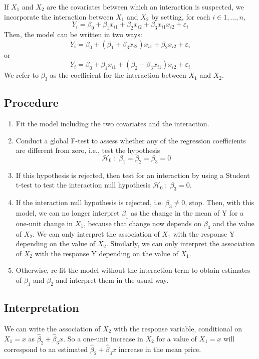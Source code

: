 \documentclass[12pt]{article}
\theoremstyle{definition}
\theoremstyle{remark}
\begin{document}
If $X_1$ and $X_2$ are the covariates between which an interaction is suspected, we incorporate the interaction between $X_1$ and $X_2$ by setting, for each $i \in {1,...,n}$,
$$Y_i =\beta_0 +\beta_1x_{i1} +\beta_2x_{i2} +\beta_3x_{i1}x_{i2} +\varepsilon_i$$
Then, the model can be written in two ways:
$$Y_i =\beta_0 +(\beta_1 +\beta_3x_{i2}) x_{i1}+\beta_2x_{i2} +\varepsilon_i$$
or 
$$Y_i =\beta_0 +\beta_1 x_{i1}+(\beta_2 + \beta_3 x_{i1})x_{i2} +\varepsilon_i$$
We refer to $\beta_3$ as the coefficient for the interaction between $X_1$ and $X_2$.

\subsection{Procedure}
\begin{enumerate}
    \item Fit the model including the two covariates and the interaction.
    \item Conduct a global F-test to assess whether any of the regression coefficients are different from zero, i.e., test the hypothesis
    $$\mathcal{H}_0 \;:\; \beta_1 = \beta_2 =\beta_3 =0$$
    \item If this hypothesis is rejected, then test for an interaction by using a Student t-test to test the interaction null hypothesis $\mathcal{H}_0 \;:\;\beta_3 =0$.
    \item If the interaction null hypothesis is rejected, i.e. $\beta_3 \neq 0$, stop. 
    Then, with this model, we can no longer interpret $\beta_1$ as the change in the mean of Y for a one-unit change in $X_1$, because that change now depends on $\beta_3$ and the value of $X_2$.
    We can only interpret the association of $X_1$ with the response Y depending on the value of $X_2$.
    Similarly, we can only interpret the association of $X_2$ with the response Y depending on the value of $X_1$.
    \item Otherwise, re-fit the model without the interaction term to obtain estimates of $\beta_1$ and $\beta_2$ and interpret them in the usual way.
\end{enumerate}
\subsection{Interpretation}
We can write the association of $X_2$ with the response variable, conditional on $X_1 = x$ as $\hat{\beta}_2 + \hat{\beta}_3x$.
So a one-unit increase in $X_2$ for a value of $X_1 = x$ will correspond to an estimated $\hat{\beta}_2 + \hat{\beta}_3x$ increase in the mean price.
\end{document}
